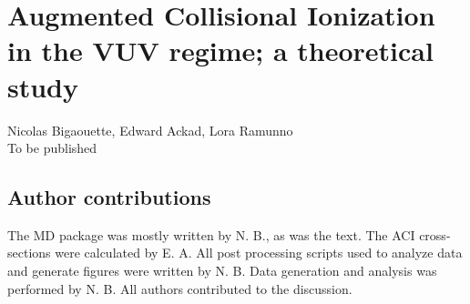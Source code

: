 
\newcommand{\PaperTitleHundrednm}{Augmented Collisional Ionization in the VUV regime; a theoretical study}

\section{\PaperTitleHundrednm}
\label{section:papers:100nm}

\begin{flushright}
Nicolas Bigaouette, Edward Ackad, Lora Ramunno\\
To be published
\end{flushright}

\HidePDFAbstractNumber

\subsection{Author contributions}
The MD package was mostly written by N. B., as was the text. The ACI cross-sections were calculated
by E. A. All post processing scripts used to analyze data and generate figures
were written by N. B. Data generation and analysis was performed by N. B.
All authors contributed to the discussion.




